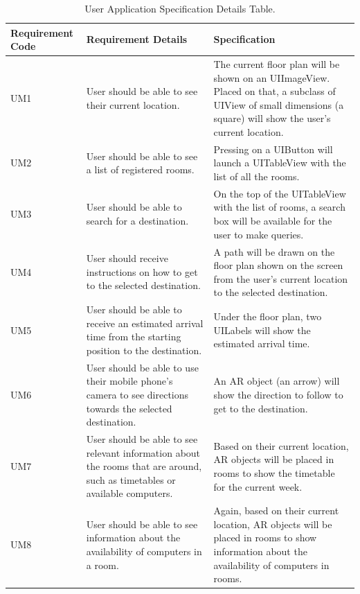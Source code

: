 \setlength\tabcolsep{4pt}
\begin{longtable}[c]{| p{2cm} | p{5cm} | p{5cm} |}
\caption{User Application Specification Details Table.\label{long}}\\
 
\hline
Requirement Code & Requirement Details & Specification \\
\hline 
\endhead

\hline
\endlastfoot

UM1 & User should be able to see their current location. & The current floor plan will be shown on an UIImageView. Placed on that, a subclass of UIView of small dimensions (a square) will show the user's current location.\\
\hline
UM2 & User should be able to see a list of registered rooms. & Pressing on a UIButton will launch a UITableView with the list of all the rooms.\\
\hline
UM3 & User should be able to search for a destination. & On the top of the UITableView with the list of rooms, a search box will be available for the user to make queries.\\
\hline
UM4 & User should receive instructions on how to get to the selected destination. & A path will be drawn on the floor plan shown on the screen from the user's current location to the selected destination.\\
\hline
UM5 & User should be able to receive an estimated arrival time from the starting position to the destination. & Under the floor plan, two UILabels will show the estimated arrival time.\\
\hline
UM6 & User should be able to use their mobile phone's camera to see directions towards the selected destination. & An AR object (an arrow) will show the direction to follow to get to the destination.\\
\hline
UM7 & User should be able to see relevant information about the rooms that are around, such as timetables or available computers. & Based on their current location, AR objects will be placed in rooms to show the timetable for the current week.\\
\hline
UM8 & User should be able to see information about the availability of computers in a room. & Again, based on their current location, AR objects will be placed in rooms to show information about the availability of computers in rooms.\\
\end{longtable}
\newpage

